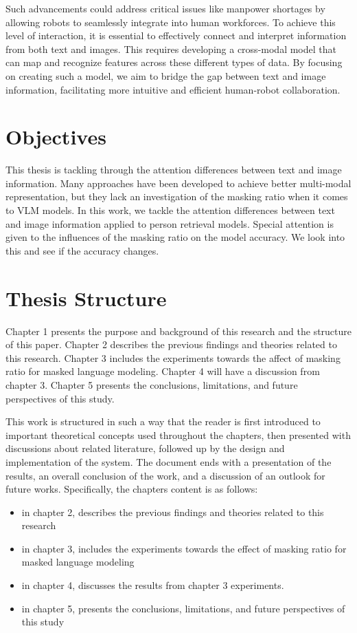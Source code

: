 Such advancements could address critical issues like manpower shortages by allowing robots to seamlessly integrate into human workforces. To achieve this level of interaction, it is essential to effectively connect and interpret information from both text and images. This requires developing a cross-modal model that can map and recognize features across these different types of data. By focusing on creating such a model, we aim to bridge the gap between text and image information, facilitating more intuitive and efficient human-robot collaboration.

\section{Objectives}
This thesis is tackling through the attention differences between text and image information. 
Many approaches have been developed to achieve better multi-modal representation, but they lack an investigation of the masking ratio when it comes to VLM models. In this work, we tackle the attention differences between text and image information applied to person retrieval models. Special attention is given to the influences of the masking ratio on the model accuracy. We look into this and see if the accuracy changes.

\section{Thesis Structure}

Chapter 1 presents the purpose and background of this research and the structure of this paper. Chapter 2 describes the previous findings and theories related to this research. Chapter 3 includes the experiments towards the affect of masking ratio for masked language modeling. Chapter 4 will have a discussion from chapter 3. Chapter 5 presents the conclusions, limitations, and future perspectives of this study.

This work is structured in such a way that the reader is first introduced to important theoretical concepts used throughout the chapters, then presented with discussions about related literature, followed up by the design and implementation of the system. The document ends with a presentation of the results, an overall conclusion of the work, and a discussion of an outlook for future works. Specifically, the chapters content is as follows:

\begin{itemize}
    \item in chapter 2, describes the previous findings and theories related to this research
    \item in chapter 3, includes the experiments towards the effect of masking ratio for masked language modeling
    \item in chapter 4, discusses the results from chapter 3 experiments.
    \item in chapter 5, presents the conclusions, limitations, and future perspectives of this study
\end{itemize}
